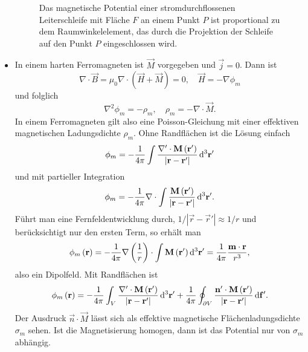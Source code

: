 \begin{itemize}
	      \begin{figure}[htb]
		      \centering
		      \tfigConductorLoopWithRefPoint
		      \caption{Das magnetische Potential einer stromdurchflossenen Leiterschleife mit Fläche $F$ an einem Punkt $P$ ist proportional zu dem Raumwinkelelement, das durch die Projektion der Schleife auf den Punkt $P$ eingeschlossen wird. }
		      \label{fig:ConductorLoopWithRefPoint}
	      \end{figure}
	\item In einem harten Ferromagneten ist $\vec {M}$ vorgegeben und $\vec {j}=0$. Dann ist
	      \begin{equation*}
		      \nabla \cdot \vec {B}=\mu _{0}\nabla \cdot \left(\vec {H}+\vec {M}\right)=0,\quad \vec {H}=-\nabla \phi _{m}
	      \end{equation*}
	      und folglich
	      \begin{equation*}
		      \nabla ^{2}\phi _{m}=-\rho _{m},\quad \rho _{m}=-\nabla \cdot \vec {M}.
	      \end{equation*}
	      In einem Ferromagneten gilt also eine Poisson-Gleichung mit einer effektiven magnetischen Ladungsdichte $\rho _{m}$. Ohne Randflächen ist die Lösung einfach
	      \begin{equation*}
		      \phi _{m}=-\frac{1}{4\pi }\int \frac{\nabla '\cdot \mathbf{M}\left(\mathbf{r}'\right)}{\left| \mathbf{r}-\mathbf{r}'\right| }\mathop{}\!\mathrm{d} ^{3}\mathbf{r}'
	      \end{equation*}
	      und mit partieller Integration
	      \begin{equation*}
		      \phi _{m}=-\frac{1}{4\pi }\nabla \cdot \int \frac{\mathbf{M}\left(\mathbf{r}'\right)}{\left| \mathbf{r}-\mathbf{r}'\right| }\mathop{}\!\mathrm{d} ^{3}\mathbf{r}'.
	      \end{equation*}
	      Führt man eine Fernfeldentwicklung durch, $1/\left| \vec {r}-\vec {r}'\right| \approx 1/r$ und berücksichtigt nur den ersten Term, so erhält man
	      \begin{equation*}
		      \phi _{m}\left(\mathbf{r}\right)=-\frac{1}{4\pi }\nabla \left(\frac{1}{r}\right)\cdot \int \mathbf{M}\left(\mathbf{r}'\right)\mathop{}\!\mathrm{d} ^{3}\mathbf{r}'=\frac{1}{4\pi }\frac{\mathbf{m}\cdot \mathbf{r}}{r^{3}},
	      \end{equation*}
	      also ein Dipolfeld. Mit Randflächen ist
	      \begin{equation*}
		      \phi _{m}\left(\mathbf{r}\right)=-\frac{1}{4\pi }\int _{V}\frac{\nabla '\cdot \mathbf{M}\left(\mathbf{r}'\right)}{\left| \mathbf{r}-\mathbf{r}'\right| }\mathop{}\!\mathrm{d} ^{3}\mathbf{r}'+\frac{1}{4\pi }\oint _{\partial V}\frac{\mathbf{n}'\cdot \mathbf{M}\left(\mathbf{r}'\right)}{\left| \mathbf{r}-\mathbf{r}'\right| }\mathop{}\!\mathrm{d} \mathbf{f}'.
	      \end{equation*}
	      Der Ausdruck $\vec {n}\cdot \vec {M}$ lässt sich als effektive magnetische Flächenladungsdichte $\sigma _{m}$ sehen. Ist die Magnetisierung homogen, dann ist das Potential nur von $\sigma _{m}$ abhängig.
\end{itemize}
